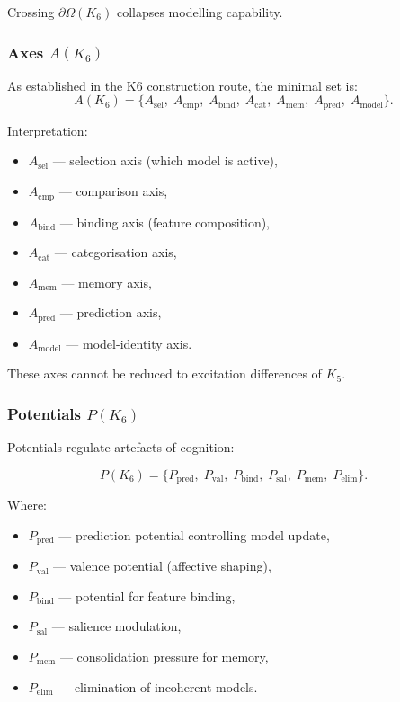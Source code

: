 Crossing $\partial \Omega(K_6)$ collapses modelling capability.

\subsubsection{Axes \texorpdfstring{$A(K_6)$}{A(K_6)}}

As established in the K6 construction route, the minimal set is:
\[
A(K_6) = \{
A_{\mathrm{sel}},\;
A_{\mathrm{cmp}},\;
A_{\mathrm{bind}},\;
A_{\mathrm{cat}},\;
A_{\mathrm{mem}},\;
A_{\mathrm{pred}},\;
A_{\mathrm{model}}
\}.
\]

Interpretation:
\begin{itemize}
    \item $A_{\mathrm{sel}}$ — selection axis (which model is active),
    \item $A_{\mathrm{cmp}}$ — comparison axis,
    \item $A_{\mathrm{bind}}$ — binding axis (feature composition),
    \item $A_{\mathrm{cat}}$ — categorisation axis,
    \item $A_{\mathrm{mem}}$ — memory axis,
    \item $A_{\mathrm{pred}}$ — prediction axis,
    \item $A_{\mathrm{model}}$ — model-identity axis.
\end{itemize}

These axes cannot be reduced to excitation differences of $K_5$.

\subsubsection{Potentials \texorpdfstring{$P(K_6)$}{P(K_6)}}

Potentials regulate artefacts of cognition:

\[
P(K_6)=
\{
P_{\mathrm{pred}},\;
P_{\mathrm{val}},\;
P_{\mathrm{bind}},\;
P_{\mathrm{sal}},\;
P_{\mathrm{mem}},\;
P_{\mathrm{elim}}
\}.
\]

Where:
\begin{itemize}
    \item $P_{\mathrm{pred}}$ — prediction potential controlling model update,
    \item $P_{\mathrm{val}}$ — valence potential (affective shaping),
    \item $P_{\mathrm{bind}}$ — potential for feature binding,
    \item $P_{\mathrm{sal}}$ — salience modulation,
    \item $P_{\mathrm{mem}}$ — consolidation pressure for memory,
    \item $P_{\mathrm{elim}}$ — elimination of incoherent models.
\end{itemize}

